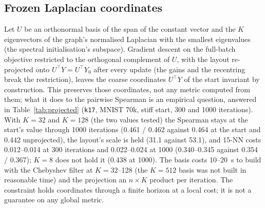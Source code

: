 \documentclass[11pt]{article}
\begin{document}
\subsection{Frozen Laplacian coordinates}\label{sec:projected}
Let $U$ be an orthonormal basis of the span of the constant vector and the $K$ eigenvectors of the
graph's normalised Laplacian with the smallest eigenvalues (the spectral initialisation's subspace).
Gradient descent on the full-batch objective restricted to the orthogonal complement of $U$, with the
layout re-projected onto $U^\top Y = U^\top Y_0$ after every update (the gains and the recentring break
the restriction), leaves the coarse coordinates $U^\top Y$ of the start invariant by construction. This
preserves those coordinates, not any metric computed from them; what it does to the pairwise Spearman
is an empirical question, answered in Table~\ref{tab:projected} (\texttt{k17}, MNIST 70k, stiff start,
300 and 1000 iterations). With $K = 32$ and $K = 128$ (the two values tested) the Spearman stays at the
start's value through 1000 iterations (0.461 / 0.462 against 0.464 at the start and 0.442 unprojected),
the layout's scale is held (31.1 against 53.1), and 15-NN costs 0.012--0.014 at 300 iterations and
0.022--0.024 at 1000 (0.340--0.345 against 0.354 / 0.367); $K = 8$ does not hold it (0.438 at 1000). The
basis costs 10--20~s to build with the Chebyshev filter at $K = 32$--128 (the $K = 512$ basis was not
built in reasonable time) and the projection an $n \times K$ product per iteration. The constraint
holds coordinates through a finite horizon at a local cost; it is not a guarantee on any global metric.
\end{document}
